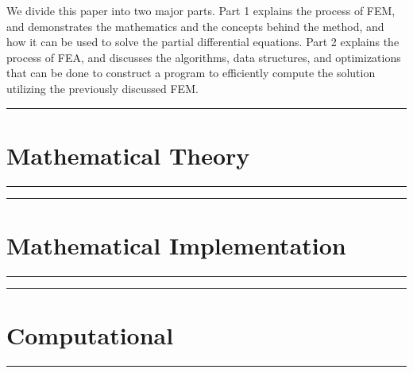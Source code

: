 \documentclass[draft,10pt]{armath}
\numberwithin{equation}{section}
\theoremstyle{definition}
\newcommand{\hdiv}[3]{
  \vspace{#1}%
  \noindent\rule{\textwidth}{#2}%
  \vspace{#3}%
}
\begin{document}
We divide this paper into two major parts. Part 1 explains the process of FEM,
and demonstrates the mathematics and the concepts behind the method, and how it
can be used to solve the partial differential equations. Part 2 explains the
process of FEA, and discusses the algorithms, data structures, and
optimizations that can be done to construct a program to efficiently compute
the solution utilizing the previously discussed FEM.

\newpage
\hdiv{10pt}{0.5pt}{1pt}
\part{Mathematical Theory}%
\label{prt:mathematical_theory}
\hdiv{1pt}{0.5pt}{10pt}







% 
% 
% 
% 
% 
% 
% 
% 
% 
% 

\newpage
\hdiv{10pt}{0.5pt}{1pt}
\part{Mathematical Implementation}%
\label{prt:mathematical_implementation}
\hdiv{1pt}{0.5pt}{10pt}








\newpage
\hdiv{10pt}{0.5pt}{1pt}
\part{Computational}%
\label{prt:computational}
\hdiv{10pt}{0.5pt}{1pt}








\newpage
\nocite{*}


\end{document}

